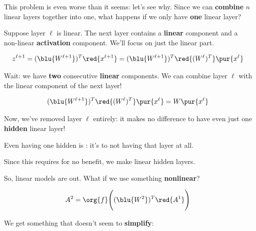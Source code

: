        This problem is even worse than it seems: let's see why. Since we can \textbf{combine} $n$ linear layers together into one, what happens if we only have \textbf{one} linear layer?

        Suppose layer $\ell$ is linear. The next layer contains a \textbf{linear} component and a non-linear \textbf{activation} component. We'll focus on just the linear part.

        \begin{equation}
            z^{\ell+1} = (\blu{W^{\ell+1}})^T\red{x^{\ell+1}} = 
            (\blu{W^{\ell+1}})^T \red{ (W^{\ell})^T } \pur{ x^{\ell} } 
        \end{equation}

        Wait: we have \textbf{two} consecutive \textbf{linear} components. We can combine layer $\ell$ with the linear component of the next layer! 

        \begin{equation}
            (\blu{W^{\ell+1}})^T \red{ (W^{\ell})^T } \pur{ x^{\ell} }  = W \pur{ x^{\ell} }
        \end{equation}
        
        Now, we've removed layer $\ell$ entirely: it makes no difference to have even just one \textbf{hidden} linear layer!\\

        \begin{concept}
            Even having one hidden  is : it's  to not having that layer at all.

            Since this requires  for no benefit, we  make linear hidden layers.
        \end{concept}

        So, linear models are out. What if we use something \textbf{nonlinear}?
        
        \begin{equation}
            A^2 = 
            \org{f}
            \Bigg( 
                (\blu{W^2})^T 
                \red{A^1}
            \Bigg)
        \end{equation}
        
        We get something that doesn't seem to \textbf{simplify}:
        

